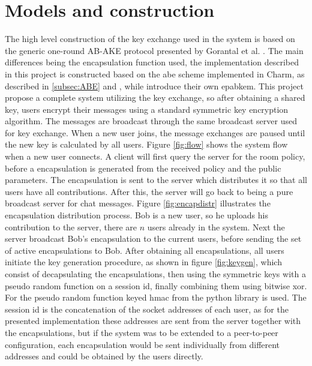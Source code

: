 \section{Models and construction}
The high level construction of the key exchange used in the system is based on the generic one-round AB-AKE protocol presented by Gorantal et al. \cite{gorantla2010attribute}. The main differences being the encapsulation function used, the implementation described in this project is constructed based on the \gls{abe} scheme implemented in Charm, as described in \ref{subsec:ABE} and \cite{abe_waters09}, while \cite{gorantla2010attribute} introduce their own \gls{epabkem}. This project propose a complete system utilizing the key exchange, so after obtaining a shared key, users encrypt their messages using a standard symmetric key encryption algorithm. The messages are broadcast through the same broadcast server used for key exchange. When a new user joins, the message exchanges are paused until the new key is calculated by all users. Figure \ref{fig:flow} shows the system flow when a new user connects. A client will first query the server for the room policy, before a encapsulation is generated from the received policy and the public parameters. The encapsulation is sent to the server which distributes it so that all users have all contributions. After this, the server will go back to being a pure broadcast server for chat messages. Figure \ref{fig:encapdistr} illustrates the encapsulation distribution process. Bob is a new user, so he uploads his contribution to the server, there are $n$ users already in the system. Next the server broadcast Bob's encapsulation to the current users, before sending the set of active encapsulations to Bob. After obtaining all encapsulations, all users initiate the key generation procedure, as shown in figure \ref{fig:keygen}, which consist of decapsulating the encapsulations, then using the symmetric keys with a pseudo random function on a session id, finally combining them using bitwise xor. For the pseudo random function keyed hmac from the python library is used. The session id is the concatenation of the socket addresses of each user, as for the presented implementation these addresses are sent from the server together with the encapsulations, but if the system was to be extended to a peer-to-peer configuration, each encapsulation would be sent individually from different addresses and could be obtained by the users directly. 




